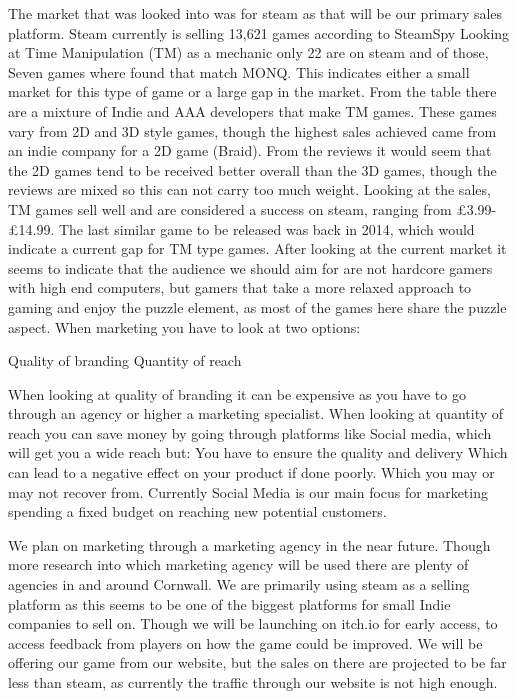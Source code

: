 \documentclass{scrartcl}
\begin{document}
The market that was looked into was for steam as that will be our primary sales platform.
Steam currently is selling 13,621 games according to SteamSpy
Looking at Time Manipulation (TM) as a mechanic only 22 are on steam and of those, Seven games where found that match MONQ.
This indicates either a small market for this type of game or a large gap in the market.
From the table there are a mixture of Indie and AAA developers that make TM games.
These games vary from 2D and 3D style games, though the highest sales achieved came from an indie company for a 2D game (Braid).
From the reviews it would seem that the 2D games tend to be received better overall than the 3D games, though the reviews are mixed so this can not carry too much weight.
Looking at the sales, TM games sell well and are considered a success on steam, ranging from £3.99-£14.99.
The last similar game to be released was back in 2014, which would indicate a current gap for TM type games.
After looking at the current market it seems to indicate that the audience we should aim for are not hardcore gamers with high end computers, but gamers that take a more relaxed approach to gaming and enjoy the puzzle element, as most of the games here share the puzzle aspect.
\newline
\newline
\newline
\newline	
When marketing you have to look at two options:
\begin{center}
	Quality of branding
	\newline
	Quantity of reach
	\newline
\end{center}
When looking at quality of branding it can be expensive as you have to go through an agency or higher a marketing specialist.
When looking at quantity of reach you can save money by going through platforms like Social media, which will get you a wide reach but:
You have to ensure the quality and delivery 
Which can lead to a negative effect on your product if done poorly.
Which you may or may not recover from.
Currently Social Media is our main focus for marketing spending a fixed budget on reaching new potential customers.

We plan on marketing through a marketing agency in the near future.
Though more research into which marketing agency will be used there are plenty of agencies in and around Cornwall.
We are primarily using steam as a selling platform as this seems to be one of the biggest platforms for small Indie companies to sell on.
Though we will be launching on itch.io for early access, to access feedback from players on how the game could be improved.
We will be offering our game from our website, but the sales on there are projected to be far less than steam, as currently the traffic through our website is not high enough.
\end{document}
